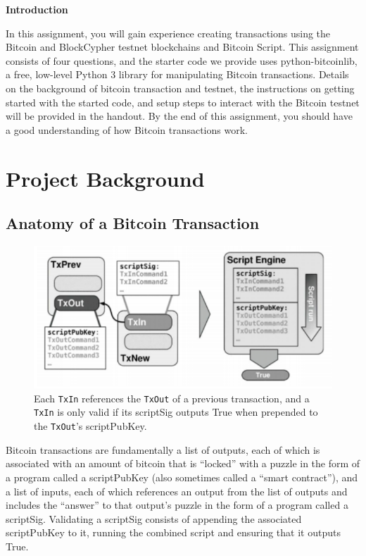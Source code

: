 \documentclass[11pt]{article}
\begin{document}
\vspace{0.2cm}

\newpage
{\bf Introduction} 
\vspace{0.2cm}

\sloppy
In this assignment, you will gain experience creating transactions using the Bitcoin and BlockCypher testnet blockchains and Bitcoin Script. This assignment consists of four questions, and the starter code we provide uses python-bitcoinlib, a free, low-level Python 3 library for manipulating Bitcoin transactions. Details on the background of bitcoin transaction and testnet, the instructions on getting started with the started code, and setup steps to interact with the Bitcoin testnet will be provided in the handout. By the end of this assignment, you should have a good understanding of how Bitcoin transactions work.

\vspace{0.2cm}

\section{Project Background}

\subsection{Anatomy of a Bitcoin Transaction}
\begin{figure}[h!]
  \centering
  \includegraphics[width=.75\textwidth]{txin_txout.png}
  \caption{Each \texttt{TxIn} references the \texttt{TxOut} of a previous
    transaction, and a \texttt{TxIn} is only valid if its scriptSig outputs
  True when prepended to the \texttt{TxOut}'s scriptPubKey.}
\label{figure:txin_txout}
\end{figure}

\hspace{20pt} Bitcoin transactions are fundamentally a list of outputs, each of which is associated with an amount of bitcoin that is ``locked'' with a puzzle in the form of a program called a scriptPubKey (also sometimes called a ``smart contract''), and a list of inputs, each of which references an output from the list of outputs and includes the ``answer'' to that output's puzzle in the form of a program called a scriptSig.
Validating a scriptSig consists of appending the associated scriptPubKey to it, running the combined script and ensuring that it outputs True.
\end{document}
